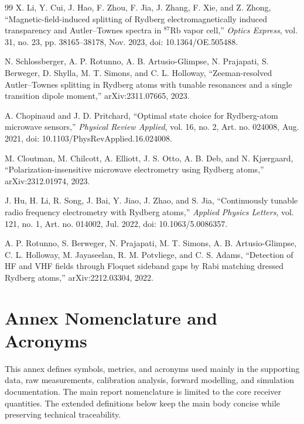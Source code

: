 \documentclass{ieeeaccess}
\begin{document}
\begin{thebibliography}{99}
X. Li, Y. Cui, J. Hao, F. Zhou, F. Jia, J. Zhang, F. Xie, and Z. Zhong, ``Magnetic-field-induced splitting of Rydberg electromagnetically induced transparency and Autler--Townes spectra in \(^{87}\mathrm{Rb}\) vapor cell,'' \emph{Optics Express}, vol. 31, no. 23, pp. 38165--38178, Nov. 2023, doi: 10.1364/OE.505488.

N. Schlossberger, A. P. Rotunno, A. B. Artusio-Glimpse, N. Prajapati, S. Berweger, D. Shylla, M. T. Simons, and C. L. Holloway, ``Zeeman-resolved Autler--Townes splitting in Rydberg atoms with tunable resonances and a single transition dipole moment,'' arXiv:2311.07665, 2023.

A. Chopinaud and J. D. Pritchard, ``Optimal state choice for Rydberg-atom microwave sensors,'' \emph{Physical Review Applied}, vol. 16, no. 2, Art. no. 024008, Aug. 2021, doi: 10.1103/PhysRevApplied.16.024008.

M. Cloutman, M. Chilcott, A. Elliott, J. S. Otto, A. B. Deb, and N. Kj{\ae}rgaard, ``Polarization-insensitive microwave electrometry using Rydberg atoms,'' arXiv:2312.01974, 2023.

J. Hu, H. Li, R. Song, J. Bai, Y. Jiao, J. Zhao, and S. Jia, ``Continuously tunable radio frequency electrometry with Rydberg atoms,'' \emph{Applied Physics Letters}, vol. 121, no. 1, Art. no. 014002, Jul. 2022, doi: 10.1063/5.0086357.

A. P. Rotunno, S. Berweger, N. Prajapati, M. T. Simons, A. B. Artusio-Glimpse, C. L. Holloway, M. Jayaseelan, R. M. Potvliege, and C. S. Adams, ``Detection of HF and VHF fields through Floquet sideband gaps by Rabi matching dressed Rydberg atoms,'' arXiv:2212.03304, 2022.

\end{thebibliography}

\clearpage
\appendices

\section{Annex Nomenclature and Acronyms}
\label{annex:nomenclature}

This annex defines symbols, metrics, and acronyms used mainly in the supporting data, raw measurements, calibration analysis, forward modelling, and simulation documentation. The main report nomenclature is limited to the core receiver quantities. The extended definitions below keep the main body concise while preserving technical traceability.
\end{document}
